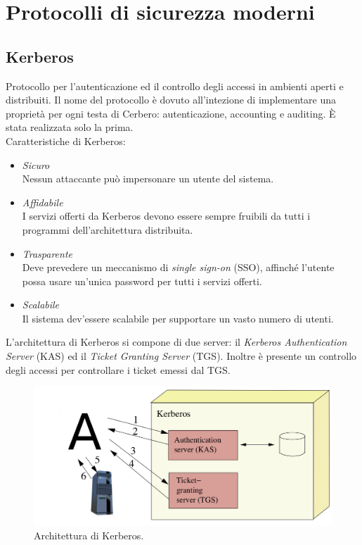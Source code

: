\documentclass[a4paper, 11pt, twoside, openright, fleqn]{report}
\begin{document}
\chapter{Protocolli di sicurezza moderni}
\section{Kerberos}
Protocollo per l'autenticazione ed il controllo degli accessi in ambienti aperti e distribuiti. Il nome del protocollo è dovuto all'intezione di implementare una proprietà per ogni testa di Cerbero: autenticazione, accounting e auditing. \`E stata realizzata solo la prima.\\
Caratteristiche di Kerberos:
\begin{itemize}
	\item \emph{Sicuro}\\
	Nessun attaccante può impersonare un utente del sistema.
	\item \emph{Affidabile}\\
	I servizi offerti da Kerberos devono essere sempre fruibili da tutti i programmi dell'architettura distribuita.
	\item \emph{Trasparente}\\
	Deve prevedere un meccanismo di \emph{single sign-on} (SSO), affinché l'utente possa usare un'unica password per tutti i servizi offerti.
	\item \emph{Scalabile}\\
	Il sistema dev'essere scalabile per supportare un vasto numero di utenti.
\end{itemize}
L'architettura di Kerberos si compone di due server: il \emph{Kerberos Authentication Server} (KAS) ed il \emph{Ticket Granting Server} (TGS). Inoltre è presente un controllo degli accessi per controllare i ticket emessi dal TGS.

\begin{figure}[htp]
	\centering
	\includegraphics[width=.9\textwidth]{images/kerberos}
	\caption{Architettura di Kerberos.}
\end{figure}
\end{document}

